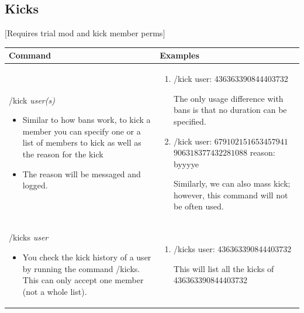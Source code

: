 \documentclass{scrartcl}
\begin{document}
\subsection{Kicks} [Requires trial mod and kick member perms]
\begin{tabularx}{\textwidth}{|>{\raggedright\arraybackslash}X|>{\raggedright\arraybackslash}X|}
\hline 
Command & Examples\\
\hline
/kick \textit{user(s)}
\begin{itemize}
    \item Similar to how bans work, to kick a member you can specify one or a list of members to kick as well as the reason for the kick
    \item The reason will be messaged and logged.
\end{itemize}
&
\begin{enumerate}
    \item /kick user: \color{gray}436363390844403732\color{black} 
    
    The only usage difference with bans is that no duration can be specified.
    \item /kick \color{black} user: \color{gray}$679102151653457941$ $906318377432281088$ \color{black} reason: \color{gray} byyyye\color{black}
    
    Similarly, we can also mass kick; however, this command will not be often used.
    
\end{enumerate}\\
\hline
/kicks \textit{user}
\begin{itemize}
    \item You check the kick history of a user by running the command /kicks. This can only accept one member (not a whole list).
\end{itemize}
&
\begin{enumerate}
    \item /kicks user: \color{gray}436363390844403732\color{black} 
    
    This will list all the kicks of 436363390844403732
\end{enumerate}\\
\hline

\end{tabularx}
\newpage
\end{document}
